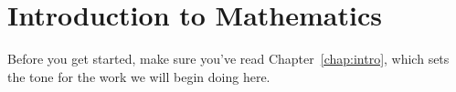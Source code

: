 \chapter{Introduction to Mathematics}

Before you get started, make sure you've read Chapter~\ref{chap:intro}, which sets the tone for the work we will begin doing here.